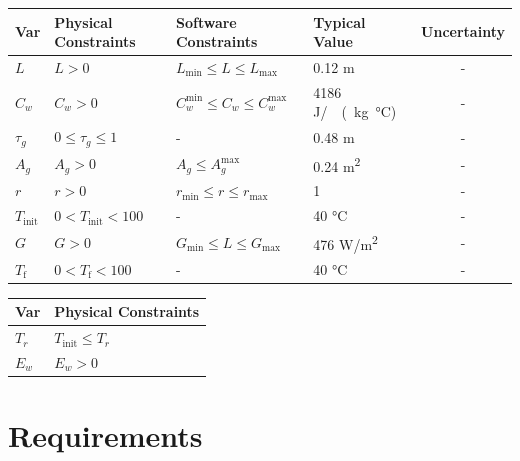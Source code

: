 \documentclass[12pt]{article}
\begin{document}
\begin{table}[!h]
  \caption{Input Variables} \label{TblInputVar}
  \renewcommand{\arraystretch}{1.2}
\noindent \begin{longtable*}{l l l l c} 
  \toprule
  \textbf{Var} & \textbf{Physical Constraints} & \textbf{Software Constraints} &
                             \textbf{Typical Value} & \textbf{Uncertainty}\\
  \midrule 
  $L$ & $L > 0$ & $L_{\text{min}} \leq L \leq L_{\text{max}}$ & 0.12 \si[per-mode=symbol] {\metre} & -
  \\
  $C_w$ & $C_w > 0$ & $C_w^\text{min} \leq C_w \leq C_w^\text{max}$ & 4186 \si[per-mode=symbol] {\joule\per\ (kg \celsius})    & - 
  \\
  $\tau_g$ & $0 \leq \tau_g \leq 1$ & - & 0.48 \si[per-mode=symbol] {\metre} & - 
  \\
  $A_g$ & $A_g > 0$ & $A_g \leq A_g^\text{max}$ & 0.24 \si[per-mode=symbol] {\square\metre}   & - 
  \\
  $r$ & $r > 0$ & $r_\text{min} \leq r \leq r_\text{max} $ & 1  & - 
  \\
  $T_\text{init}$ & $0 < T_\text{init} < 100$ & - & 40 \si[per-mode=symbol] {\celsius} & - 
  \\
  $G$ & $G > 0$ & $G_{\text{min}} \leq L \leq G_{\text{max}}$ & 476 \si[per-mode=symbol] {\watt\per\square\metre} & - 
  \\
  $T_\text{f}$ & $0 < T_\text{f} < 100$ & - & 40 \si[per-mode=symbol] {\celsius} & - 
  \\
  
  \bottomrule
\end{longtable*}
\end{table}


\begin{table}[!h]
\caption{Output Variables} \label{TblOutputVar}
\renewcommand{\arraystretch}{1.2}
\noindent \begin{longtable*}{l l} 
  \toprule
  \textbf{Var} & \textbf{Physical Constraints} \\
  \midrule 
  $T_r$ & $T_\text{init} \leq T_r $
  \\
  $E_w$ & $E_w > 0$ \\
  \bottomrule
\end{longtable*}
\end{table}


\section{Requirements}
\end{document}
